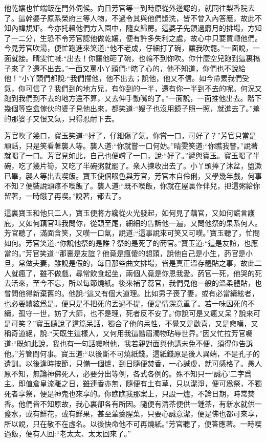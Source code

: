 \begin{parag}
    他乾孃也忙端飯在門外伺候。向日芳官等一到時原從外邊認的，就同往梨香院去了。這幹婆子原系榮府三等人物，不過令其與他們漿洗，皆不曾入內答應，故此不知內幃規矩。今亦托賴他們方入園中，隨女歸房。這婆子先領過麝月的排場，方知了一二分，生恐不令芳官認他做乾孃，便有許多失利之處，故心中只要買轉他們。今見芳官吹湯，便忙跑進來笑道:“他不老成，仔細打了碗，讓我吹罷。”一面說，一面就接。晴雯忙喊:“出去！你讓他砸了碗，也輪不到你吹。你什麼空兒跑到這裏槅子來了？還不出去。”一面又罵小丫頭們:“瞎了心的，他不知道，你們也不說給他！”小丫頭們都說:“我們攆他，他不出去；說他，他又不信。如今帶累我們受氣，你可信了？我們到的地方兒，有你到的一半，還有你一半到不去的呢。何況又跑到我們到不去的地方還不算，又去伸手動嘴的了。”一面說，一面推他出去。階下幾個等空盒傢伙的婆子見他出來，都笑道:“嫂子也沒用鏡子照一照，就進去了。”羞的那婆子又恨又氣，只得忍耐下去。
\end{parag}


\begin{parag}
    芳官吹了幾口，寶玉笑道:“好了，仔細傷了氣。你嘗一口，可好了？”芳官只當是頑話，只是笑看著襲人等。襲人道:“你就嘗一口何妨。”晴雯笑道:“你瞧我嘗。”說著就喝了一口。芳官見如此，自己也便嚐了一口，說:“好了。”遞與寶玉。寶玉喝了半碗，吃了幾片筍，又吃了半碗粥就罷了。衆人揀收出去了。小丫頭捧了沐盆，盥漱已畢，襲人等出去喫飯。寶玉使個眼色與芳官，芳官本自伶俐，又學幾年戲，何事不知？便裝說頭疼不喫飯了。襲人道:“既不喫飯，你就在屋裏作伴兒，把這粥給你留著，一時餓了再喫。”說著，都去了。
\end{parag}


\begin{parag}
    這裏寶玉和他只二人，寶玉便將方纔從火光發起，如何見了藕官，又如何謊言護庇，又如何藕官叫我問你，從頭至尾，細細的告訴他一遍，又問他祭的果系何人。芳官聽了，滿面含笑，又嘆一口氣，說道:“這事說來可笑又可嘆。”寶玉聽了，忙問如何。芳官笑道:“你說他祭的是誰？祭的是死了的菂官。”寶玉道:“這是友誼，也應當的。”芳官笑道:“那裏是友誼？他竟是瘋傻的想頭，說他自己是小生，菂官是小旦，常做夫妻，雖說是假的，每日那些曲文排場，皆是真正溫存體貼之事，故此二人就瘋了，雖不做戲，尋常飲食起坐，兩個人竟是你恩我愛。菂官一死，他哭的死去活來，至今不忘，所以每節燒紙。後來補了蕊官，我們見他一般的溫柔體貼，也曾問他得新棄舊的。他說:‘這又有個大道理。比如男子喪了妻，或有必當續絃者，也必要續絃爲是。便只是不把死的丟過不提，便是情深意重了。若一味因死的不續，孤守一世，妨了大節，也不是理，死者反不安了。’你說可是又瘋又呆？說來可是可笑？”寶玉聽說了這篇呆話，獨合了他的呆性，不覺又是歡喜，又是悲嘆，又稱奇道絕，說:“天既生這樣人，又何用我這鬚眉濁物玷辱世界。”因又忙拉芳官囑道:“既如此說，我也有一句話囑咐他，我若親對面與他講未免不便，須得你告訴他。”芳管問何事。寶玉道:“以後斷不可燒紙錢。這紙錢原是後人異端，不是孔子的遺訓。以後逢時按節，只備一個爐，到日隨便焚香，一心誠虔，就可感格了。愚人原不知，無論神佛死人，必要分出等例，各式各例的。殊不知只一‘誠心’二字爲主。即值倉皇流離之日，雖連香亦無，隨便有土有草，只以潔淨，便可爲祭，不獨死者享祭，便是神鬼也來享的。你瞧瞧我那案上，只設一爐，不論日期，時常焚香。他們皆不知原故，我心裏卻各有所因。隨便有清茶便供一鍾茶，有新水就供一盞水，或有鮮花，或有鮮果，甚至葷羹腥菜，只要心誠意潔，便是佛也都可來享，所以說，只在敬不在虛名。以後快命他不可再燒紙。”芳官聽了，便答應著。一時喫過飯，便有人回:“老太太、太太回來了。”
\end{parag}
